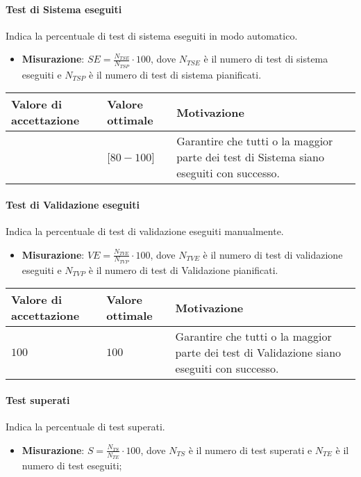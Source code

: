 \paragraph{Test di Sistema eseguiti}
Indica la percentuale di test di sistema eseguiti in modo automatico.
\begin{itemize}
\item \textbf{Misurazione}: $SE=\frac{N_{TSE}}{N_{TSP}} \cdot 100$, dove $N_{TSE}$ è il numero di test di sistema eseguiti e $N_{TSP}$ è il numero di test di sistema pianificati.
\end{itemize}

\begin{center}
		\begin{tabular}{|P{2.5cm}|P{2.5cm}|P{6cm}|}
		\hline
			\textbf{Valore di accettazione}	& \textbf{Valore ottimale} & \textbf{Motivazione} \\
			\hline
			[$70 - 100$] & [$80 - 100$] &	Garantire che tutti o la maggior parte dei test di Sistema siano eseguiti con successo. \\
			\hline
			\end{tabular}
\end{center}

\paragraph{Test di Validazione eseguiti}
Indica la percentuale di test di validazione eseguiti manualmente.
\begin{itemize}
\item \textbf{Misurazione}: $VE=\frac{N_{TVE}}{N_{TVP}} \cdot 100$, dove $N_{TVE}$ è il numero di test di validazione eseguiti e $N_{TVP}$ è il numero di test di Validazione pianificati.
\end{itemize}

\begin{center}
		\begin{tabular}{|P{2.5cm}|P{2.5cm}|P{6cm}|}
		\hline
			\textbf{Valore di accettazione}	& \textbf{Valore ottimale} & \textbf{Motivazione} \\
			\hline
			$100$ & $100$ &	Garantire che tutti o la maggior parte dei test di Validazione siano eseguiti con successo. \\
			\hline
			\end{tabular}
\end{center}

\paragraph{Test superati}
Indica la percentuale di test superati.
\begin{itemize}
\item \textbf{Misurazione}: $S=\frac{N_{TS}}{N_{TE}} \cdot 100$, dove $N_{TS}$ è il numero di test superati e $N_{TE}$ è il numero di test eseguiti;
\end{itemize}

